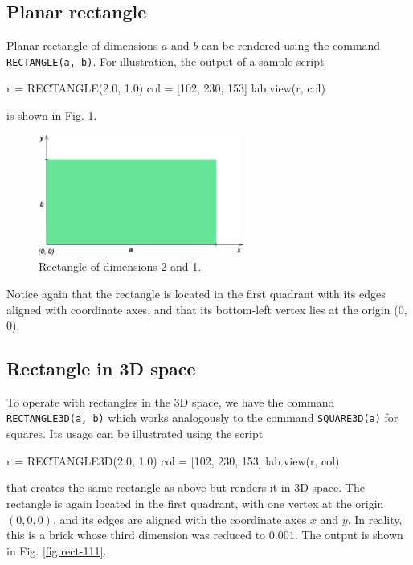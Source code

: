 \subsection{Planar rectangle}

\noindent
Planar rectangle of dimensions $a$ and $b$ can be rendered using the 
command {\tt RECTANGLE(a, b)}. For illustration, the output of a sample script

\begin{bluecode}
r = RECTANGLE(2.0, 1.0)
col = [102, 230, 153]
lab.view(r, col)
\end{bluecode}
\noindent
is shown in Fig. \ref{fig:cuboid-2}.

\begin{figure}[!ht]
\begin{center}
\includegraphics[width=0.6\textwidth]{img/cuboid-2.png}
\end{center}
\vspace{-4mm}
\caption{Rectangle of dimensions 2 and 1.}
\label{fig:cuboid-2}
\end{figure}
\noindent
Notice again that the rectangle is located in the first quadrant with its edges 
aligned with coordinate axes, and that its bottom-left vertex lies at the 
origin (0, 0).

\subsection{Rectangle in 3D space}

To operate with rectangles in the 3D space, we have the command {\tt RECTANGLE3D(a, b)}
which works analogously to the command {\tt SQUARE3D(a)} for squares. Its usage
can be illustrated using the script 

\begin{bluecode}
r = RECTANGLE3D(2.0, 1.0)
col = [102, 230, 153]
lab.view(r, col)
\end{bluecode}
\noindent
that creates the same rectangle as above but renders it in 3D space.
The rectangle is again located in the first quadrant, with one vertex 
at the origin $(0, 0, 0)$, and its edges are aligned with the coordinate
axes $x$ and $y$. In reality, this is a brick whose third dimension was
reduced to $0.001$. The output is shown in Fig. \ref{fig:rect-111}.

